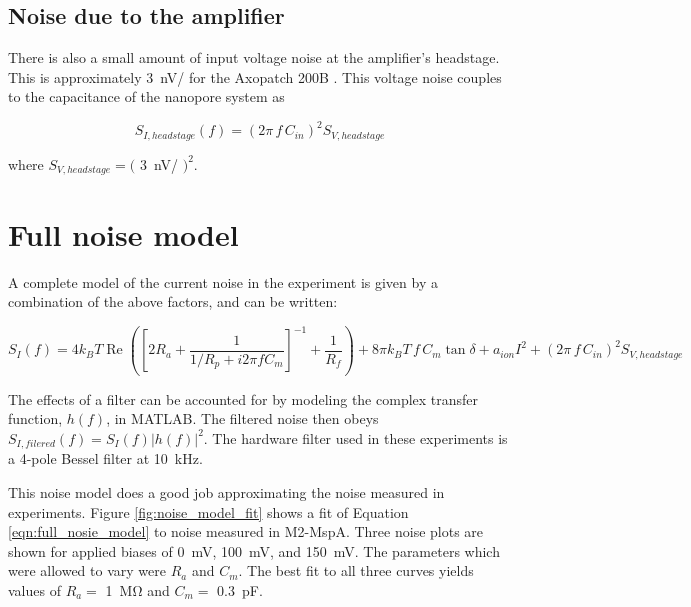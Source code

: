 
\subsection{Noise due to the amplifier}

There is also a small amount of input voltage noise at the amplifier's headstage.  This is approximately \SI{3}{\nV/\sqrt{\Hz}} for the Axopatch 200B \citep{Sakmann1995}.  This voltage noise couples to the capacitance of the nanopore system as 

\begin{equation}
S_{I,headstage}(f) = (2 \pi \, f \, C_{in})^2 S_{V,headstage}
\label{eqn:headstage}
\end{equation}

\noindent
where $S_{V,headstage} = ($ \SI{3}{\nV/\sqrt{\Hz}} $)^2$.

\section{Full noise model}

A complete model of the current noise in the experiment is given by a combination of the above factors, and can be written:

\begin{equation}
S_I(f) = 4 k_B T \operatorname{Re} \left( \left[ 2 R_a + \frac{1}{ 1/R_p + i 2 \pi f C_m } \right]^{-1} + \frac{1}{R_f} \right) + 8 \pi k_B T \, f \, C_m \tan \delta + a_{ion} I^2 + (2 \pi \, f \, C_{in})^2 S_{V,headstage}
\label{eqn:full_nosie_model}
\end{equation}

The effects of a filter can be accounted for by modeling the complex transfer function, $h(f)$, in MATLAB.  The filtered noise then obeys $S_{I,filered}(f) = S_I(f) |h(f)|^2$.  The hardware filter used in these experiments is a 4-pole Bessel filter at \SI{10}{\kHz}.

This noise model does a good job approximating the noise measured in experiments.  Figure \ref{fig:noise_model_fit} shows a fit of Equation \ref{eqn:full_nosie_model} to noise measured in M2-MspA.  Three noise plots are shown for applied biases of \SI{0}{\mV}, \SI{100}{\mV}, and \SI{150}{\mV}.  The parameters which were allowed to vary were $R_a$ and $C_m$.  The best fit to all three curves yields values of $R_a = $ \SI{1}{\mega\ohm} and $C_m = $ \SI{0.3}{\pF}.

